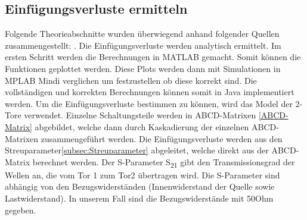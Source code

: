 \subsection{Einfügungsverluste ermitteln} \label{subsec:vorgehen}
Folgende Theorieabschnitte wurden überwiegend anhand folgender Quellen zusammengestellt: \cite{hftech}.
Die Einfügungsverluste werden analytisch ermittelt. Im ersten Schritt werden die Berechnungen in MATLAB gemacht. Somit können die Funktionen  geplottet werden. Diese Plots werden dann mit Simulationen in MPLAB Mindi verglichen um festzustellen ob diese korrekt sind. Die vollständigen und korrekten Berechnungen können somit in Java implementiert werden. Um die Einfügungsverluste bestimmen zu können, wird das Model der 2-Tore verwendet. Einzelne Schaltungsteile werden in ABCD-Matrixen \ref{ABCD-Matrix} abgebildet, welche dann durch Kaskadierung der einzelnen ABCD-Matrixen zusammengeführt werden. Die Einfügungsverluste werden aus den Streuparameter\ref{subsec:Streuparameter} abgeleitet, welche direkt aus der ABCD-Matrix berechnet werden.
Der S-Parameter S\textsubscript{21} gibt den Transmissionsgrad der Wellen an, die vom Tor 1 zum Tor2 übertragen wird. Die S-Parameter sind abhängig von den Bezugswiderständen (Innenwiderstand der Quelle sowie Lastwiderstand). In unserem Fall sind die Bezugswiderstände mit 50Ohm gegeben.

\newpage
